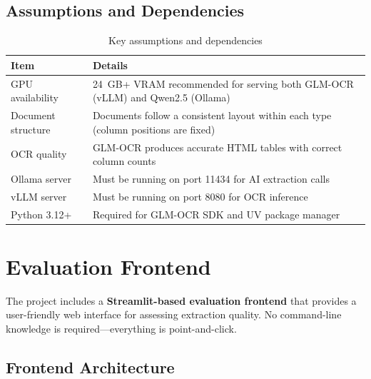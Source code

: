 \documentclass[12pt,a4paper]{report}
\begin{document}
\section{Assumptions and Dependencies}

\begin{table}[H]
\centering\small\sffamily
\begin{tabularx}{\textwidth}{l X}
\toprule
\textbf{Item} & \textbf{Details} \\
\midrule
GPU availability & 24~GB+ VRAM recommended for serving both GLM-OCR (vLLM) and Qwen2.5 (Ollama) \\
Document structure & Documents follow a consistent layout within each type (column positions are fixed) \\
OCR quality & GLM-OCR produces accurate HTML tables with correct column counts \\
Ollama server & Must be running on port 11434 for AI extraction calls \\
vLLM server & Must be running on port 8080 for OCR inference \\
Python 3.12+ & Required for GLM-OCR SDK and UV package manager \\
\bottomrule
\end{tabularx}
\caption{Key assumptions and dependencies}
\end{table}

\chapter{Evaluation Frontend}

The project includes a \textbf{Streamlit-based evaluation frontend} that provides a user-friendly web interface for assessing extraction quality. No command-line knowledge is required---everything is point-and-click.

\section{Frontend Architecture}
\end{document}
